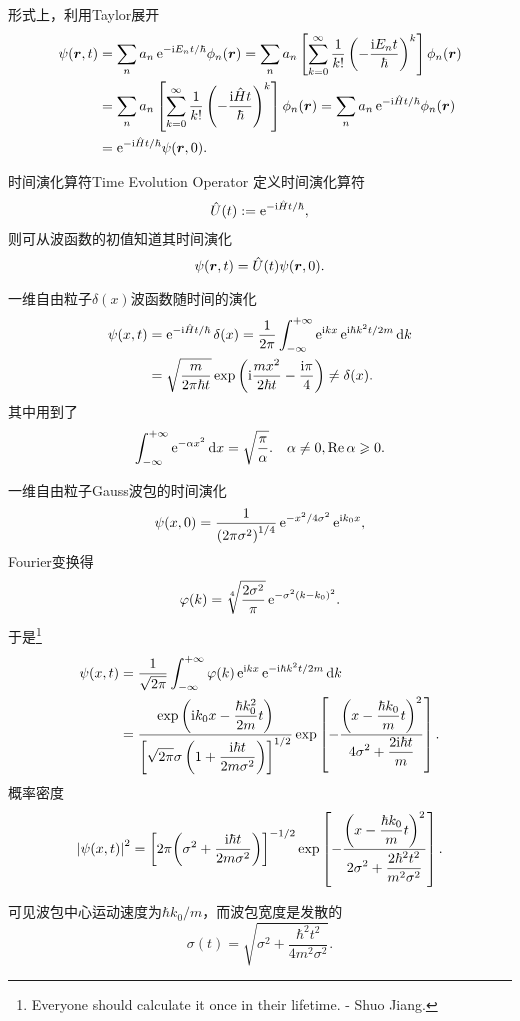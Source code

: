 形式上，利用Taylor展开
\begin{align*}
	\psi(\bm r,t) & =\sum_na_n\mathop{}\!\mathrm{e}^{-\mathrm{i} E_nt/\hbar}\phi_n(\bm r)=\sum_na_n\left[\sum_{k=0}^\infty\frac1{k!}\left(-\frac{\mathrm{i} E_nt}\hbar\right)^k\right]\phi_n(\bm r)     \\
	           & =\sum_na_n\left[\sum_{k=0}^\infty\frac1{k!}\left(-\frac{\mathrm{i}\hat Ht}\hbar\right)^k\right]\phi_n(\bm r)=\sum_na_n\mathop{}\!\mathrm{e}^{-\mathrm{i}\hat Ht/\hbar}\phi_n(\bm r) \\
	           & =\mathop{}\!\mathrm{e}^{-\mathrm{i}\hat Ht/\hbar}\psi(\bm r,0).
\end{align*}
\begin{definition}{时间演化算符}{Time Evolution Operator}
	定义时间演化算符
	\begin{align}
		\hat U(t):=\mathop{}\!\mathrm{e}^{-\mathrm{i}\hat Ht/\hbar},
	\end{align}
	则可从波函数的初值知道其时间演化
	\[
		\psi(\bm r,t)=\hat U(t)\psi(\bm r,0).
\]
\end{definition}
\begin{example}
	{一维自由粒子$\delta(x)$波函数随时间的演化}{}
	\begin{equation*}
		\begin{aligned}
			\psi(x,t) & =\mathop{}\!\mathrm{e}^{-\mathrm{i}\hat Ht/\hbar}\mathop{}\!\delta(x)=\frac1{2\pi}\int_{-\infty}^{+\infty}\mathop{}\!\mathrm{e}^{\mathrm{i} kx}\mathop{}\!\mathrm{e}^{\mathrm{i}\hbar k^2t/2m}\mathop{}\!\mathrm{d} k      \\
			          & =\sqrt{\frac m{2\pi\hbar t}}\exp\left(\mathrm{i}\frac{mx^2}{2\hbar t}-\frac{\mathrm{i}\pi}4\right)\neq\mathop{}\!\delta(x).
		\end{aligned}
	\end{equation*}
	其中用到了
	\begin{align}
		\int_{-\infty}^{+\infty}\mathop{}\!\mathrm{e}^{-\alpha x^2}\mathop{}\!\mathrm{d} x=\sqrt{\frac\pi\alpha}.\quad\alpha\neq 0,\operatorname{Re}\alpha\geqslant 0.
	\end{align}
\end{example}
\begin{example}
	{一维自由粒子Gauss波包的时间演化}{}
	\[
		\psi(x,0)=\frac1{\left(2\pi\sigma^2\right)^{1/4}}\mathop{}\!\mathrm{e}^{-x^2/4\sigma^2}\mathop{}\!\mathrm{e}^{\mathrm{i} k_0x},
	\]
	Fourier变换得
	\[
		\varphi(k)=\sqrt[4]{\frac{2\sigma^2}{\pi}}\mathop{}\!\mathrm{e}^{-\sigma^2(k-k_0)^2}.
	\]%
	于是\footnote{Everyone should calculate it once in their lifetime. - Shuo Jiang.}
	\begin{align*}
		\psi(x,t) & =\frac1{\sqrt{2\pi}}\int_{-\infty}^{+\infty}\varphi(k)\mathop{}\!\mathrm{e}^{\mathrm{i} kx}\mathop{}\!\mathrm{e}^{-\mathrm{i}\hbar k^2t/2m}\mathop{}\!\mathrm{d} k                                                                                                                            \\
		          & =\frac{\displaystyle \exp\left(\mathrm{i} k_0x-\frac{\hbar k_0^2}{2m}t\right)}{\displaystyle \left[\sqrt{2\pi}\sigma\left(1+\frac{\mathrm{i}\hbar t}{2m\sigma^2}\right)\right]^{1/2}}\exp\left[-\frac{\displaystyle \left(x-\frac{\hbar k_0}mt\right)^2}{\displaystyle 4\sigma^2+\frac{2\mathrm{i}\hbar t}m}\right].
	\end{align*}
	概率密度
	\begin{align*}
		\left\lvert\psi(x,t)\right\rvert^2=\left[2\pi\!\left(\sigma^2+\frac{\mathrm{i}\hbar t}{2m\sigma^2}\right)\right]^{-1/2}\exp\left[-\frac{\displaystyle \left(x-\frac{\hbar k_0}mt\right)^2}{\displaystyle 2\sigma^2+\frac{2\hbar^2 t^2}{m^2\sigma^2}}\right].
	\end{align*}
	
	可见波包中心运动速度为$\hbar k_0/m$，而波包宽度是发散的
	\[
		\sigma(t)=\sqrt{\sigma^2+\frac{\hbar^2t^2}{4m^2\sigma^2}}.
	\]
\end{example}

